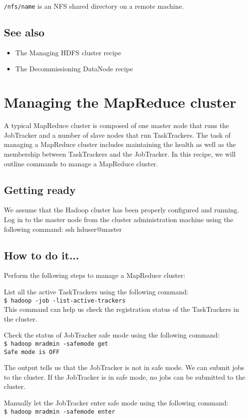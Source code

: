 \verb|/nfs/name| is an NFS shared directory on a remote machine.
\subsection*{See also}
\begin{itemize}
\item The Managing HDFS cluster recipe
\item The Decommissioning DataNode recipe
\end{itemize}

\section{Managing the MapReduce cluster}
A typical MapReduce cluster is composed of one master node that runs the JobTracker and a number of slave nodes that run TaskTrackers. The task of managing a MapReduce cluster includes maintaining the health as well as the membership between TaskTrackers and the JobTracker. In this recipe, we will outline commands to manage a MapReduce cluster.
\subsection*{Getting ready}
We assume that the Hadoop cluster has been properly configured and running.
Log in to the master node from the cluster administration machine using the following command:
ssh hduser@master
\subsection*{How to do it...}
Perform the following steps to manage a MapReduce cluster:

List all the active TaskTrackers using the following command: \\
\verb|$ hadoop -job -list-active-trackers| \\
This command can help us check the registration status of the TaskTrackers in the cluster.

Check the status of JobTracker safe mode using the following command: \\
\verb|$ hadoop mradmin -safemode get| \\
\verb|Safe mode is OFF|

The output tells us that the JobTracker is not in safe mode. We can submit jobs to the cluster. If the JobTracker is in safe mode, no jobs can be submitted to the cluster.

Manually let the JobTracker enter safe mode using the following command: \\
\verb|$ hadoop mradmin -safemode enter|


